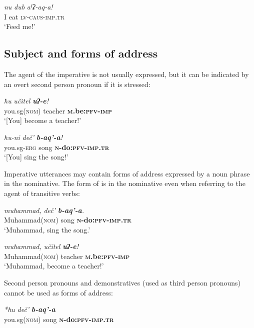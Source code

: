 ﻿\documentclass[output=paper]{langsci/langscibook}
\begin{document}
\ea %
\gll \emph{nu} \emph{dub} \emph{aˤʡ-aq-a!}\\
I eat \textsc{lv}-\textsc{caus}-\textsc{imp}.\textsc{tr}\\
\glt `Feed me!'
\z


\subsection{Subject and forms of address}\label{subject-and-forms-of-address}

The agent of the imperative is not usually expressed, but it can be
indicated by an overt second person pronoun if it is stressed:

\ea %
\gll  \emph{ħu}  \emph{učitel}  \emph{\textbf{uʔ-e}!}\\
 you.sg(\textsc{nom})  teacher  \textbf{\textsc{m}.be:\textsc{pfv}-\textsc{imp}}\\
\glt `[You] become a teacher!'

\ex %
\gll  \emph{ħu-ni}  \emph{deč'}  \emph{\textbf{b-aq'-a}!}\\
 you.sg-\textsc{erg}  song  \textbf{\textsc{n}-do:\textsc{pfv}-\textsc{imp}.\textsc{tr}}\\
\glt `[You] sing the song!'
\z

Imperative utterances may contain forms of address expressed by a noun phrase in the nominative. The form of 
is in the nominative even when referring to the agent of transitive
verbs:

\ea %
\gll  \emph{muħammad,}  \emph{deč'}  \emph{\textbf{b-aq'-a}.}\\
 Muhammad(\textsc{nom})  song  \textbf{\textsc{n}-do:\textsc{pfv}-\textsc{imp}.\textsc{tr}}\\
\glt `Muhammad, sing the song.'

\ex %
\gll  \emph{muħammad,}  \emph{učitel}  \emph{\textbf{uʔ-e}!}\\
 Muhammad(\textsc{nom})  teacher  \textbf{\textsc{m}.be:\textsc{pfv}-\textsc{imp}}\\
\glt `Muhammad, become a teacher!'
\z

Second person pronouns and demonstratives (used as third person
pronouns) cannot be used as forms of address:

\ea %
\gll  \emph{*ħu}  \emph{deč'}  \emph{\textbf{b-aq'-a}}\\
 you.sg(\textsc{nom})  song  \textbf{\textsc{n}-do:\textsc{pfv}-\textsc{imp}.\textsc{tr}}\\
\end{document}
